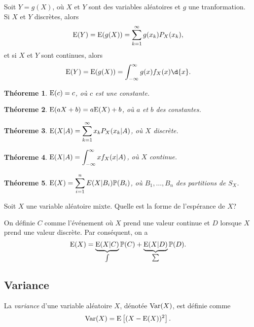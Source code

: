 \documentclass[11pt]{article}
\renewcommand\P{%
	\ensuremath{%
		\mathbb{P}%
	}%
}%
\newcommand\Esp{%
	\ensuremath{%
		\mathrm{E}%
	}%
}%
\newcommand\Var{%
	\ensuremath{%
		\mathrm{Var}%
	}%
}%
\newtheorem{theoreme}{Théoreme}[section]
\begin{document}
Soit $Y=g(X)$, où $X$ et $Y$ sont des variables aléatoires et $g$ une
tranformation. Si $X$ et $Y$ discrètes, alors
\begin{equation*}
	\Esp(Y)=\Esp(g(X))=\sum_{k=1}^\infty g(x_k)P_X(x_k),
\end{equation*}
et si $X$ et $Y$ sont continues, alors
\begin{equation*}
	\Esp(Y)=\Esp(g(X))=\int_{-\infty}^\infty g(x)f_X(x)\d{x}.
\end{equation*}

\begin{theoreme}
	$\Esp(c)=c$, où $c$ est une constante.
\end{theoreme}

\begin{theoreme}
	$\Esp(aX+b)=a\Esp(X)+b$, où $a$ et $b$ des constantes.
\end{theoreme}

\begin{theoreme}
	$\Esp(X|A)=\displaystyle\sum_{k=1}^\infty x_kP_X(x_k|A)$, où $X$ discrète.
\end{theoreme}

\begin{theoreme}
	$\Esp(X|A)=\displaystyle\int_{-\infty}^\infty xf_X(x|A)$, où $X$ continue.
\end{theoreme}

\begin{theoreme}
	$\Esp(X)=\displaystyle\sum_{i=1}^nE(X|B_i)\P(B_i)$, où $B_1,\dots,B_n$ des
	partitions de $S_X$.
\end{theoreme}

\begin{exemple}
	Soit $X$ une variable aléatoire mixte. Quelle est la forme de l'espérance
	de $X$?

	On définie $C$ comme l'événement où $X$ prend une valeur continue et $D$
	lorsque $X$ prend une valeur discrète. Par conséquent, on a
	\begin{equation*}
		\Esp(X)=\underbrace{\Esp(X|C)}_{\int}\P(C)
		+\underbrace{\Esp(X|D)}_{\sum}\P(D).
	\end{equation*}
\end{exemple}

\subsection{Variance}
\begin{definition}
	La \textit{variance} d'une variable aléatoire $X$, dénotée $\Var(X)$, est
	définie comme
	\begin{equation*}
		\Var(X)=\Esp\left[(X-\Esp(X))^2\right].
	\end{equation*}
\end{definition}
\end{document}
